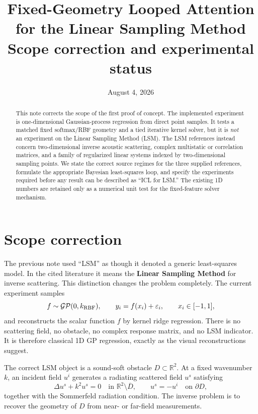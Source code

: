 \documentclass[10pt]{article}
\title{Fixed-Geometry Looped Attention for the Linear Sampling Method\\
\large Scope correction and experimental status}
\author{}
\date{August 4, 2026}
\newcommand{\R}{\mathbb R}
\begin{document}
\maketitle
\vspace{-2.2em}

\begin{abstract}
This note corrects the scope of the first proof of concept.  The implemented
experiment is one-dimensional Gaussian-process regression from direct point
samples.  It tests a matched fixed softmax/RBF geometry and a tied iterative
kernel solver, but it is \emph{not} an experiment on the Linear Sampling Method
(LSM).  The LSM references instead concern two-dimensional inverse acoustic
scattering, complex multistatic or correlation matrices, and a family of
regularized linear systems indexed by two-dimensional sampling points.  We
state the correct source regimes for the three supplied references, formulate
the appropriate Bayesian least-squares loop, and specify the experiments
required before any result can be described as ``ICL for LSM.''  The existing
1D numbers are retained only as a numerical unit test for the fixed-feature
solver mechanism.
\end{abstract}

\section{Scope correction}

The previous note used ``LSM'' as though it denoted a generic least-squares
model.  In the cited literature it means the \textbf{Linear Sampling Method}
for inverse scattering.  This distinction changes the problem completely.
The current experiment samples
\[
 f\sim\mathcal{GP}(0,k_{\rm RBF}),\qquad
 y_i=f(x_i)+\varepsilon_i,\qquad x_i\in[-1,1],
\]
and reconstructs the scalar function $f$ by kernel ridge regression.  There is
no scattering field, no obstacle, no complex response matrix, and no LSM
indicator.  It is therefore classical 1D GP regression, exactly as the visual
reconstructions suggest.

The correct LSM object is a sound-soft obstacle $D\subset\R^2$.  At a fixed
wavenumber $k$, an incident field $u^i$ generates a radiating scattered field
$u^s$ satisfying
\begin{equation}
 \Delta u^s+k^2u^s=0\quad\text{in }\R^2\setminus\overline D,
 \qquad u^s=-u^i\quad\text{on }\partial D,
 \label{eq:helmholtz}
\end{equation}
together with the Sommerfeld radiation condition.  The inverse problem is to
recover the geometry of $D$ from near- or far-field measurements.
\end{document}
